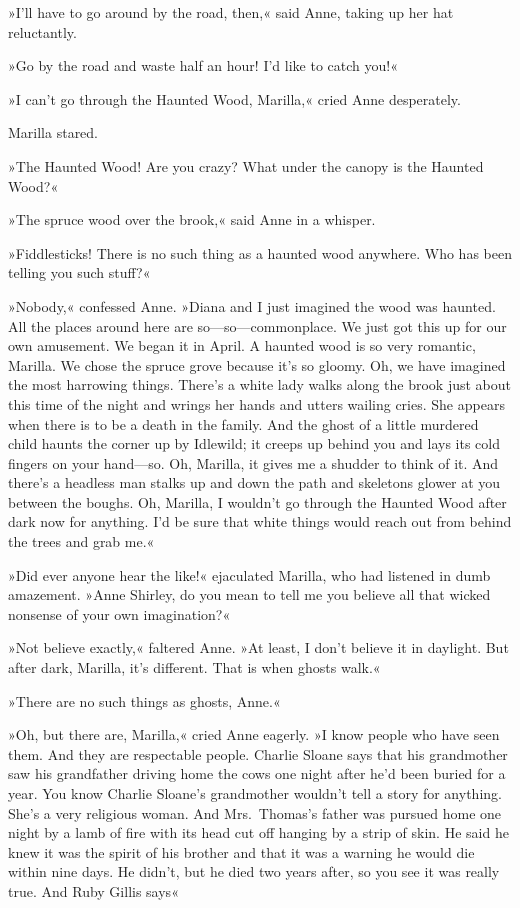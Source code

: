 »I'll have to go around by the road, then,« said Anne, taking up her hat reluctantly.

»Go by the road and waste half an hour! I'd like to catch you!«

»I can't go through the Haunted Wood, Marilla,« cried Anne desperately.

Marilla stared.

»The Haunted Wood! Are you crazy? What under the canopy is the Haunted Wood?«

»The spruce wood over the brook,« said Anne in a whisper.

»Fiddlesticks! There is no such thing as a haunted wood anywhere. Who has been telling you such stuff?«

»Nobody,« confessed Anne. »Diana and I just imagined the wood was haunted. All the places around here are so—so—commonplace. We just got this up for our own amusement. We began it in April. A haunted wood is so very romantic, Marilla. We chose the spruce grove because it's so gloomy. Oh, we have imagined the most harrowing things. There's a white lady walks along the brook just about this time of the night and wrings her hands and utters wailing cries. She appears when there is to be a death in the family. And the ghost of a little murdered child haunts the corner up by Idlewild; it creeps up behind you and lays its cold fingers on your hand—so. Oh, Marilla, it gives me a shudder to think of it. And there's a headless man stalks up and down the path and skeletons glower at you between the boughs. Oh, Marilla, I wouldn't go through the Haunted Wood after dark now for anything. I'd be sure that white things would reach out from behind the trees and grab me.«

»Did ever anyone hear the like!« ejaculated Marilla, who had listened in dumb amazement. »Anne Shirley, do you mean to tell me you believe all that wicked nonsense of your own imagination?«

»Not believe exactly,« faltered Anne. »At least, I don't believe it in daylight. But after dark, Marilla, it's different. That is when ghosts walk.«

»There are no such things as ghosts, Anne.«

»Oh, but there are, Marilla,« cried Anne eagerly. »I know people who have seen them. And they are respectable people. Charlie Sloane says that his grandmother saw his grandfather driving home the cows one night after he'd been buried for a year. You know Charlie Sloane's grandmother wouldn't tell a story for anything. She's a very religious woman. And Mrs.~Thomas's father was pursued home one night by a lamb of fire with its head cut off hanging by a strip of skin. He said he knew it was the spirit of his brother and that it was a warning he would die within nine days. He didn't, but he died two years after, so you see it was really true. And Ruby Gillis says\longdash«

